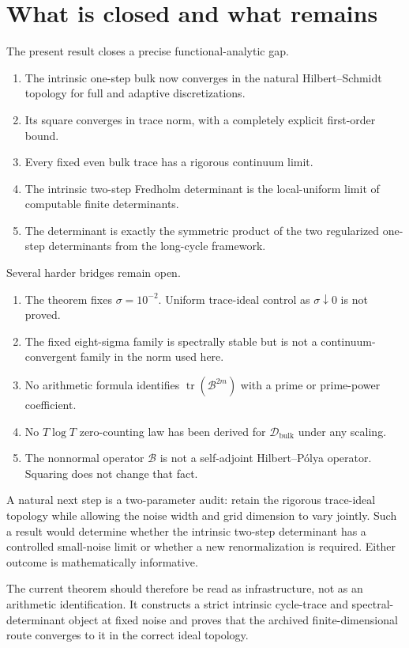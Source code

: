 \documentclass[11pt]{article}
\theoremstyle{definition}
\theoremstyle{remark}
\newcommand{\cB}{\mathcal B}
\newcommand{\cD}{\mathcal D}
\newcommand{\tr}{\operatorname{tr}}
\begin{document}
\section{What is closed and what remains}
\label{sec:boundary}

The present result closes a precise functional-analytic gap.
\begin{enumerate}[leftmargin=2em]
 \item The intrinsic one-step bulk now converges in the natural
 Hilbert--Schmidt topology for full and adaptive discretizations.
 \item Its square converges in trace norm, with a completely explicit
 first-order bound.
 \item Every fixed even bulk trace has a rigorous continuum limit.
 \item The intrinsic two-step Fredholm determinant is the local-uniform
 limit of computable finite determinants.
 \item The determinant is exactly the symmetric product of the two
 regularized one-step determinants from the long-cycle framework.
\end{enumerate}

Several harder bridges remain open.
\begin{enumerate}[leftmargin=2em]
 \item The theorem fixes $\sigma=10^{-2}$.  Uniform trace-ideal control as
 $\sigma\downarrow0$ is not proved.
 \item The fixed eight-sigma family is spectrally stable but is not a
 continuum-convergent family in the norm used here.
 \item No arithmetic formula identifies $\tr(\cB^{2m})$ with a prime or
 prime-power coefficient.
 \item No $T\log T$ zero-counting law has been derived for
 $\cD_{\mathrm{bulk}}$ under any scaling.
 \item The nonnormal operator $\cB$ is not a self-adjoint
 Hilbert--P\'olya operator.  Squaring does not change that fact.
\end{enumerate}

A natural next step is a two-parameter audit: retain the rigorous
trace-ideal topology while allowing the noise width and grid dimension to
vary jointly.  Such a result would determine whether the intrinsic
two-step determinant has a controlled small-noise limit or whether a new
renormalization is required.  Either outcome is mathematically informative.

The current theorem should therefore be read as infrastructure, not as an
arithmetic identification.  It constructs a strict intrinsic cycle-trace
and spectral-determinant object at fixed noise and proves that the archived
finite-dimensional route converges to it in the correct ideal topology.
\end{document}
